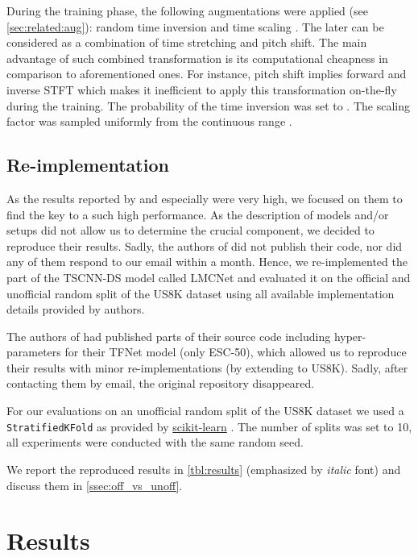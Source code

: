 \documentclass[a4paper,conference]{IEEEtran}
\begin{document}
During the training phase, the following augmentations were applied (see \autoref{sec:related:aug}): random time inversion and time scaling  \cite{tokozume2017envnetv2}.
The later can be considered as a combination of time stretching and pitch shift.
The main advantage of such combined transformation is its computational cheapness in comparison to aforementioned ones.
For instance, pitch shift implies forward and inverse STFT which makes it inefficient to apply this transformation on-the-fly during the training.
The probability of the time inversion was set to .
The scaling factor was sampled uniformly from the continuous range .

\subsection{Re-implementation} \label{ssec:reimpl}

As the results reported by \cite{wang2019tfnet} and especially \cite{su2019tscnnds} were very high, we focused on them to find the key to a such high performance.
As the description of models and\:/\:or setups did not allow us to determine the crucial component, we decided to reproduce their results.
Sadly, the authors of \cite{su2019tscnnds} did not publish their code, nor did any of them respond to our email within a month.
Hence, we re-implemented the part of the \mbox{TSCNN-DS} model called \mbox{LMCNet} and evaluated it on the official \cite{salamon2014us8k} and unofficial random split of the US8K dataset using all available implementation details provided by authors.

The authors of \cite{wang2019tfnet} had published parts of their source code including hyper-parameters for their \mbox{TFNet} model (only ESC-50), which allowed us to reproduce their results with minor re-implementations (by extending to US8K).
Sadly, after contacting them by email, the original repository disappeared.

For our evaluations on an unofficial random split of the US8K dataset we used a \texttt{StratifiedKFold} as provided by \href{https://scikit-learn.org}{scikit-learn} \cite{pedregosa2011sklearn}.
The number of splits was set to 10, all experiments were conducted with the same random seed.

We report the reproduced results in \autoref{tbl:results} (emphasized by \emph{italic} font) and discuss them in \autoref{ssec:off_vs_unoff}.

\section{Results} \label{sec:results}
\end{document}
